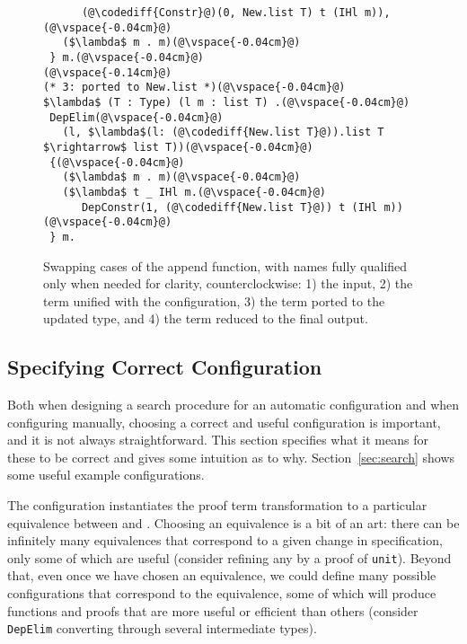 \begin{figure}
\begin{minipage}{0.49\textwidth}
\begin{lstlisting}
      (@\codediff{Constr}@)(0, New.list T) t (IHl m)),(@\vspace{-0.04cm}@)
   ($\lambda$ m . m)(@\vspace{-0.04cm}@)
 } m.(@\vspace{-0.04cm}@)
(@\vspace{-0.14cm}@)
(* 3: ported to New.list *)(@\vspace{-0.04cm}@)
$\lambda$ (T : Type) (l m : list T) .(@\vspace{-0.04cm}@)
 DepElim(@\vspace{-0.04cm}@)
   (l, $\lambda$(l: (@\codediff{New.list T}@)).list T $\rightarrow$ list T))(@\vspace{-0.04cm}@)
 {(@\vspace{-0.04cm}@)
   ($\lambda$ m . m)(@\vspace{-0.04cm}@)
   ($\lambda$ t _ IHl m.(@\vspace{-0.04cm}@)
      DepConstr(1, (@\codediff{New.list T}@)) t (IHl m))(@\vspace{-0.04cm}@)
 } m.
\end{lstlisting}
\end{minipage}
\vspace{-0.3cm}
\caption{Swapping cases of the append function, with names fully qualified only when needed for clarity, counterclockwise: 1) the input, 2) the term unified with the configuration, 3) the term ported to the updated type, and 4) the term reduced to the final output.}
\label{fig:appswap1}
\end{figure}

\subsection{Specifying Correct Configuration}
\label{sec:art}

Both when designing a search procedure for an automatic configuration and when
configuring \toolname manually, choosing a correct and useful configuration is important,
and it is not always straightforward. This section specifies what it means for these
to be correct and gives some intuition as to why.
Section~\ref{sec:search} shows some useful example configurations.

The configuration instantiates the proof term transformation to a particular equivalence between \A and \B.
Choosing an equivalence is a bit of an art:
there can be infinitely many equivalences that correspond to a 
given change in specification, only some of which are useful (consider refining any \A by a proof of \lstinline{unit}).
Beyond that, even once we have chosen an equivalence, we could define many possible configurations that correspond
to the equivalence, some of which will produce functions and proofs that are more useful or efficient than others
(consider \lstinline{DepElim} converting through several intermediate types).

